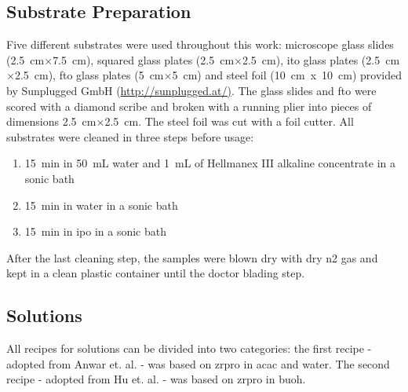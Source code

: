\documentclass[a4paper]{article}
\newcommand{\td}[1]{\textcolor{red}{#1}}
\newcommand{\ds}[1]{}
\newcommand{\x}{$\times$}
\newcommand{\cm}[1]{\SI{#1}{\centi\meter}}
\newcommand{\ml}[1]{\SI{#1}{\milli\liter}}
\newcommand{\minutes}[1]{\SI{#1}{\minute}}
\begin{document}
\subsection{Substrate Preparation}
Five different substrates were used throughout this work: 
microscope glass slides (\cm{2.5}\x\cm{7.5})\ds{ from Sigma Aldrich},\ds{ thinner,} squared glass plates (\cm{2.5}\x\cm{2.5})\ds{ from Sigma Aldrich}, \gls{ito} glass plates (\cm{2.5}\x\cm{2.5})\ds{ from Sigma Aldrich}, \gls{fto} glass plates (\cm{5}\x\cm{5})\ds{ from Sigma Aldrich} and steel foil (10~cm~x~10~cm) provided by Sunplugged GmbH (\url{http://sunplugged.at/)}.
The glass slides and \gls{fto} were scored with a diamond scribe \ds{\td{(diamond scratcher/scraper)} }and broken with a running plier into pieces of dimensions \cm{2.5}\x\cm{2.5}.
The steel foil was cut with a foil cutter.
All substrates were cleaned in three steps before usage:
\begin{enumerate}
	\item \minutes{15} in \ml{50} \gls{water} and \ml{1} of Hellmanex III alkaline concentrate in a sonic bath
	\item \minutes{15} in \gls{water} in a sonic bath
	\item \minutes{15} in \gls{ipo} in a sonic bath 
\end{enumerate}
After the last cleaning step, the samples were blown dry with dry \gls{n2} gas and kept in a clean plastic container until the doctor blading step.

\subsection{Solutions}
All recipes for solutions can be divided into two categories:
the first recipe - adopted from Anwar et. al. \cite{Anwar2017} - was based on \gls{zrpro} in \gls{acac} and \gls{water}.
The second recipe - adopted from Hu et. al. \cite{Hu2016} - was based on \gls{zrpro} in \gls{buoh}.
\end{document}
